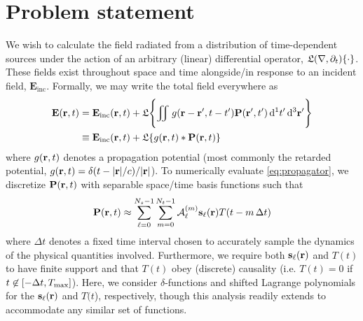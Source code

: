 \section{Problem statement}

We wish to calculate the field radiated from a distribution of time-dependent sources under the action of an arbitrary (linear) differential operator, $\mathfrak{L}(\nabla, \partial_t)\qty{\cdot}$.
These fields exist throughout space and time alongside/in response to an incident field, $\mathbf{E}_\text{inc}$.
Formally, we may write the total field everywhere as
\begin{equation}
  \begin{aligned}
    \vb{E}(\vb{r}, t) & = \vb{E}_\text{inc}(\vb{r}, t) + \mathfrak{L}\qty{\iint_{} \kern0.1emg(\vb{r} - \vb{r}', t - t') \vb{P}(\vb{r}', t') \dd[1]{t'} \dd[3]{\vb{r}'}} \\
                      & \equiv \vb{E}_\text{inc}(\vb{r}, t) + \mathfrak{L}\qty{g(\vb{r}, t) \ast \vb{P}(\vb{r}, t)}
    \end{aligned}
  \label{eq:propagator}
\end{equation}
where $g(\vb{r}, t)$ denotes a propagation potential (most commonly the retarded potential, $g(\vb{r}, t) = \delta(t - \abs{\vb{r}}/c)/\abs{\vb{r}}$).
To numerically evaluate \cref{eq:propagator}, we discretize $\vb{P}(\vb{r}, t)$ with separable space/time basis functions such that
\begin{equation}
  \vb{P}(\vb{r}, t) \approx \sum_{\ell = 0}^{N_s - 1} \sum_{m = 0}^{N_t - 1} \mathcal{A}_\ell^{(m)} \vb{s}_\ell(\vb{r}) T(t - m \, \Delta t)
  \label{eq:discretization}
\end{equation}
where $\Delta t$ denotes a fixed time interval chosen to accurately sample the dynamics of the physical quantities involved.
Furthermore, we require both $\vb{s}_\ell(\vb{r})$ and $T(t)$ to have finite support and that $T(t)$ obey (discrete) causality (i.e. $T(t) = 0$ if $t \not \in \qty[-\Delta t, T_\text{max}]$).
Here, we consider $\delta$-functions and shifted Lagrange polynomials for the $\vb{s}_\ell(\vb{r})$ and $T(t$), respectively, though this analysis readily extends to accommodate any similar set of functions.

